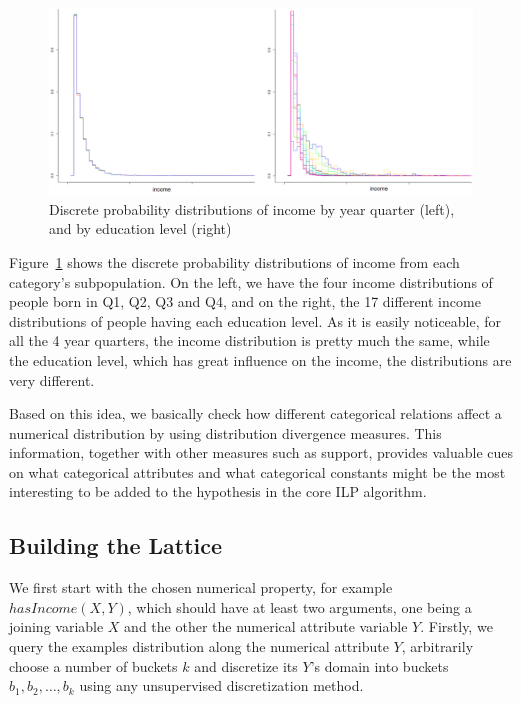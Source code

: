 \begin{figure}[h!]
\label{fig:income-education}
\caption{Discrete probability distributions of income by year quarter (left), and by education level (right)}
\begin{center}
  \includegraphics[width=1\linewidth]{./Figures/birthquarter-education.png}
\end{center}
\end{figure}

Figure~\ref{fig:income-education} shows the discrete probability distributions of income from each category's
subpopulation. On the left, we have the four income distributions of people born in Q1, Q2, Q3 and Q4, and on the
right, the 17 different income distributions of people having each education level. As it is easily noticeable, for all
the 4 year quarters, the income distribution is pretty much the same, while the education level, which has great
influence on the income, the distributions are very different.

Based on this idea, we basically check how different categorical relations affect a numerical distribution by using
distribution divergence measures. This information, together with other measures such as support, provides valuable
cues on what categorical attributes and what categorical constants might be the most interesting to be added to the
hypothesis in the core ILP algorithm.


\subsection{Building the Lattice}

We first start with the chosen numerical property, for example $hasIncome(X,Y)$, which should have at least two
arguments, one being a joining variable $X$ and the other the numerical attribute variable $Y$. Firstly, we query the
examples distribution along the numerical attribute $Y$, arbitrarily choose a number of buckets $k$ and discretize
its $Y$'s domain into buckets $b_1, b_2, \dots, b_k$ using any unsupervised discretization method. 

